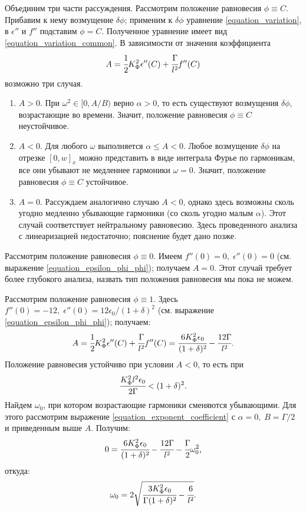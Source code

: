 \documentclass[a4paper,12pt]{article}
\theoremstyle{plain}
\theoremstyle{definition}
\begin{document}
Объединим три части рассуждения. Рассмотрим положение равновесия $\phi \equiv C$. Прибавим к нему возмущение $\delta \phi$; применим к $\delta \phi$ уравнение \eqref{equation_variation}, в $\epsilon''$ и $f''$ подставим $\phi = C$. Полученное уравнение имеет вид \eqref{equation_variation_common}. В зависимости от значения коэффициента
$$A = \cfrac{1}{2} K_\Phi^2 \epsilon''(C) + \cfrac{\Gamma}{l^2} f''(C)$$
возможно три случая.
\begin{enumerate}[label=\arabic*.]
    \item $A > 0$. При $\omega^2 \in [0, A/B)$ верно $\alpha > 0$, то есть существуют возмущения $\delta \phi$, возрастающие во времени. Значит, положение равновесия $\phi \equiv C$ неустойчивое.
    \item $A < 0$. Для любого $\omega$ выполняется $\alpha \leqslant A < 0$. Любое возмущение $\delta \phi$ на отрезке $[0, w]_x$ можно представить в виде интеграла Фурье по гармоникам, все они убывают не медленнее гармоники $\omega = 0$. Значит, положение равновесия $\phi \equiv C$ устойчивое.
    \item $A = 0$. Рассуждаем аналогично случаю $A < 0$, однако здесь возможны сколь угодно медленно убывающие гармоники (со сколь угодно малым $\alpha$). Этот случай соответствует нейтральному равновесию. Здесь проведенного анализа с линеаризацией недостаточно; пояснение будет дано позже.
\end{enumerate}

Рассмотрим положение равновесия $\phi \equiv 0$. Имеем $f''(0) = 0, \; \epsilon''(0) = 0$ (см. выражение \eqref{equation_epsilon_phi_phi}); получаем $A = 0$. Этот случай требует более глубокого анализа, назвать тип положения равновесия мы пока не можем.

Рассмотрим положение равновесия $\phi \equiv 1$. Здесь $f''(0) = -12, \; \epsilon''(0) = 12 \epsilon_0/(1 + \delta)^2$ (см. выражение \eqref{equation_epsilon_phi_phi}); получаем:
$$A = \cfrac{1}{2} K_\Phi^2 \epsilon''(C) + \cfrac{\Gamma}{l^2} f''(C) = \cfrac{6 K_\Phi^2 \epsilon_0}{(1 + \delta)^2} - \cfrac{12 \Gamma}{l^2} \text{.}$$
Положение равновесия устойчиво при условии $A < 0$, то есть при
\begin{equation}
    \cfrac{K_\Phi^2 l^2 \epsilon_0}{2 \Gamma} < (1 + \delta)^2 \text{.}
    \label{condition_equilibrium_1_stable}
\end{equation}
Найдем $\omega_0$, при котором возрастающие гармоники сменяются убывающими. Для этого рассмотрим выражение \eqref{equation_exponent_coefficient} с $\alpha = 0, \; B = \Gamma / 2$ и приведенным выше $A$. Получим:
$$0 = \cfrac{6 K_\Phi^2 \epsilon_0}{(1 + \delta)^2} - \cfrac{12 \Gamma}{l^2} - \cfrac{\Gamma}{2} \omega_0^2 \text{,}$$
откуда:
$$\omega_0 = 2 \sqrt{\cfrac{3 K_\Phi^2 \epsilon_0}{\Gamma (1 + \delta)^2} - \cfrac{6}{l^2}} \text{.}$$
\end{document}
